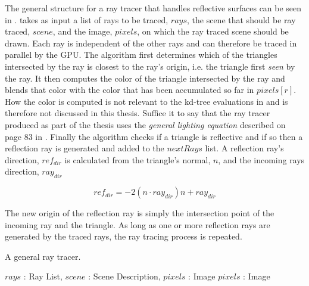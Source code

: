 The general structure for a ray tracer that handles reflective surfaces can be
seen in .  takes as
input a list of rays to be traced, $rays$, the scene that should be ray traced,
$scene$, and the image, $pixels$, on which the ray traced scene should be
drawn. Each ray is independent of the other rays and can therefore be traced in
parallel by the GPU. The algorithm first determines which of the triangles
intersected by the ray is closest to the ray's origin, i.e. the triangle first
\textit{seen} by the ray. It then computes the color of the triangle intersected
by the ray and blends that color with the color that has been accumulated so far
in $pixels[r]$. How the color is computed is not relevant to the kd-tree
evaluations in  and is therefore not discussed in this
thesis. Suffice it to say that the ray tracer produced as part of the thesis
uses the \textit{general lighting equation} described on page 83 in
. Finally the algorithm checks if a triangle is reflective and if
so then a reflection ray is generated and added to the $nextRays$ list. A
reflection ray's direction, $ref_{dir}$ is calculated from the triangle's
normal, $n$, and the incoming rays direction, $ray_{dir}$

\begin{displaymath}
  ref_{dir} = -2 (n \cdot ray_{dir}) n + ray_{dir}
\end{displaymath}

The new origin of the reflection ray is simply the intersection point of the
incoming ray and the triangle. As long as one or more reflection rays are
generated by the traced rays, the ray tracing process is repeated.

\begin{algorithm}
  \caption{A general ray tracer.}
  \label{alg:generalRayTracer}
  \begin{algorithmic}
              {$rays$ : Ray List, $scene$ : Scene Description, $pixels$ : Image}
              {$pixels$ : Image}{
                  \ENDIF
                \ENDFOR
                \ENDIF
              }
  \end{algorithmic}
\end{algorithm}

